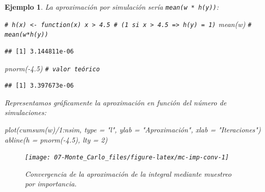 \documentclass[
]{book}
\newenvironment{Shaded}{\begin{snugshade}}{\end{snugshade}}
\newcommand{\AttributeTok}[1]{\textcolor[rgb]{0.77,0.63,0.00}{#1}}
\newcommand{\CommentTok}[1]{\textcolor[rgb]{0.56,0.35,0.01}{\textit{#1}}}
\newcommand{\DecValTok}[1]{\textcolor[rgb]{0.00,0.00,0.81}{#1}}
\newcommand{\FloatTok}[1]{\textcolor[rgb]{0.00,0.00,0.81}{#1}}
\newcommand{\FunctionTok}[1]{\textcolor[rgb]{0.00,0.00,0.00}{#1}}
\newcommand{\NormalTok}[1]{#1}
\newcommand{\SpecialCharTok}[1]{\textcolor[rgb]{0.00,0.00,0.00}{#1}}
\newcommand{\StringTok}[1]{\textcolor[rgb]{0.31,0.60,0.02}{#1}}
\theoremstyle{break}
\newtheorem{example}{Ejemplo}[chapter]
\theoremstyle{nonumberplain}
\renewcommand{\CommentTok}[1]{\textcolor[rgb]{0.41,0.41,0.41}{\texttt{#1}}}
\begin{document}
\begin{example}
La aproximación por simulación sería \texttt{mean(w\ *\ h(y))}:

\begin{Shaded}
\begin{Highlighting}[]
\CommentTok{\# h(x) \textless{}{-} function(x) x \textgreater{} 4.5  \# (1 si x \textgreater{} 4.5 =\textgreater{} h(y) = 1)}
\FunctionTok{mean}\NormalTok{(w) }\CommentTok{\# mean(w*h(y))}
\end{Highlighting}
\end{Shaded}

\begin{verbatim}
## [1] 3.144811e-06
\end{verbatim}

\begin{Shaded}
\begin{Highlighting}[]
\FunctionTok{pnorm}\NormalTok{(}\SpecialCharTok{{-}}\FloatTok{4.5}\NormalTok{)  }\CommentTok{\# valor teórico}
\end{Highlighting}
\end{Shaded}

\begin{verbatim}
## [1] 3.397673e-06
\end{verbatim}

Representamos gráficamente la aproximación en función del número de simulaciones:

\begin{Shaded}
\begin{Highlighting}[]
\FunctionTok{plot}\NormalTok{(}\FunctionTok{cumsum}\NormalTok{(w)}\SpecialCharTok{/}\DecValTok{1}\SpecialCharTok{:}\NormalTok{nsim, }\AttributeTok{type =} \StringTok{"l"}\NormalTok{, }\AttributeTok{ylab =} \StringTok{"Aproximación"}\NormalTok{, }\AttributeTok{xlab =} \StringTok{"Iteraciones"}\NormalTok{)}
\FunctionTok{abline}\NormalTok{(}\AttributeTok{h =} \FunctionTok{pnorm}\NormalTok{(}\SpecialCharTok{{-}}\FloatTok{4.5}\NormalTok{), }\AttributeTok{lty =} \DecValTok{2}\NormalTok{)}
\end{Highlighting}
\end{Shaded}

\begin{figure}[!htb]

{\centering \texttt{[image: 07-Monte\_Carlo\_files/figure-latex/mc-imp-conv-1]} 

}

\caption{Convergencia de la aproximación de la integral mediante muestreo por importancia.}\label{fig:mc-imp-conv}
\end{figure}


\end{example}
\end{document}
